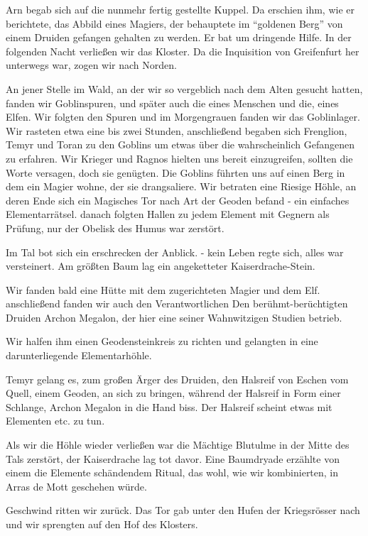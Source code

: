 Arn begab sich auf die nunmehr fertig gestellte Kuppel. Da erschien ihm, wie er berichtete, das Abbild eines Magiers, der behauptete im ``goldenen Berg'' von einem Druiden gefangen gehalten zu werden. Er bat um dringende Hilfe.
In der folgenden Nacht verließen wir das Kloster. Da die Inquisition von Greifenfurt her unterwegs war, zogen wir nach Norden.

An jener Stelle im Wald, an der wir so vergeblich nach dem Alten gesucht hatten, fanden wir Goblinspuren, und später auch die eines Menschen und die, eines Elfen. Wir folgten den Spuren und im Morgengrauen fanden wir das Goblinlager. Wir rasteten etwa eine bis zwei Stunden, anschließend begaben sich Frenglion, Temyr und Toran zu den Goblins um etwas über die wahrscheinlich Gefangenen zu erfahren. Wir Krieger und Ragnos hielten uns bereit einzugreifen, sollten die Worte versagen, doch sie genügten. Die Goblins führten uns auf einen Berg in dem ein Magier wohne, der sie drangsaliere. Wir betraten eine Riesige Höhle, an deren Ende sich ein Magisches Tor nach Art der Geoden befand - ein einfaches Elementarrätsel. danach folgten Hallen zu jedem Element mit Gegnern als Prüfung, nur der Obelisk des Humus war zerstört.

Im Tal bot sich ein erschrecken der Anblick. - kein Leben regte sich, alles war versteinert. Am größten Baum lag ein angeketteter Kaiserdrache-Stein.

Wir fanden bald eine Hütte mit dem zugerichteten Magier und dem Elf. anschließend fanden wir auch den Verantwortlichen Den berühmt-berüchtigten Druiden Archon Megalon, der hier eine seiner Wahnwitzigen Studien betrieb.

Wir halfen ihm einen Geodensteinkreis zu richten und gelangten in eine darunterliegende Elementarhöhle.

Temyr gelang es, zum großen Ärger des Druiden, den Halsreif von Eschen vom Quell, einem Geoden, an sich zu bringen, während der Halsreif in Form einer Schlange, Archon Megalon in die Hand biss. Der Halsreif scheint etwas mit Elementen etc. zu tun.

Als wir die Höhle wieder verließen war die Mächtige Blutulme in der Mitte des Tals zerstört, der Kaiserdrache lag tot davor. Eine Baumdryade erzählte von einem die Elemente schändendem Ritual, das wohl, wie wir kombinierten, in Arras de Mott geschehen würde.

Geschwind ritten wir zurück. Das Tor gab unter den Hufen der Kriegsrösser nach und wir sprengten auf den Hof des Klosters.

